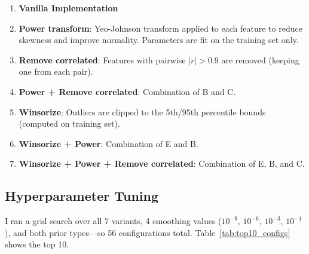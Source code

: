 \documentclass[journal,onecolumn]{IEEEtran}
\begin{document}
\begin{enumerate}
    \item[\textbf{A.}] \textbf{Vanilla Implementation}
    \item[\textbf{B.}] \textbf{Power transform}: Yeo-Johnson transform applied to each feature to reduce skewness and improve normality. Parameters are fit on the training set only.
    \item[\textbf{C.}] \textbf{Remove correlated}: Features with pairwise $|r| > 0.9$ are removed (keeping one from each pair).
    \item[\textbf{D.}] \textbf{Power + Remove correlated}: Combination of B and C.
    \item[\textbf{E.}] \textbf{Winsorize}: Outliers are clipped to the 5th/95th percentile bounds (computed on training set).
    \item[\textbf{F.}] \textbf{Winsorize + Power}: Combination of E and B.
    \item[\textbf{G.}] \textbf{Winsorize + Power + Remove correlated}: Combination of E, B, and C.
\end{enumerate}

\subsection{Hyperparameter Tuning}

I ran a grid search over all 7 variants, 4 smoothing values ($10^{-9}$, $10^{-6}$, $10^{-3}$, $10^{-1}$), and both prior types---so 56 configurations total. Table~\ref{tab:top10_configs} shows the top 10.
\end{document}
